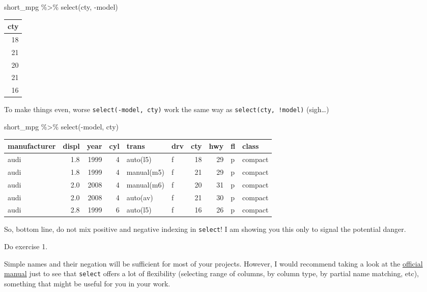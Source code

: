 \documentclass[
]{book}
\newenvironment{Shaded}{\begin{snugshade}}{\end{snugshade}}
\newcommand{\FunctionTok}[1]{\textcolor[rgb]{0.00,0.00,0.00}{#1}}
\newcommand{\NormalTok}[1]{#1}
\newcommand{\SpecialCharTok}[1]{\textcolor[rgb]{0.00,0.00,0.00}{#1}}
\begin{document}
\begin{Shaded}
\begin{Highlighting}[]
\NormalTok{short\_mpg }\SpecialCharTok{\%\textgreater{}\%}
  \FunctionTok{select}\NormalTok{(cty, }\SpecialCharTok{{-}}\NormalTok{model)}
\end{Highlighting}
\end{Shaded}

\begin{tabular}{r}
\hline
cty\\
\hline
18\\
\hline
21\\
\hline
20\\
\hline
21\\
\hline
16\\
\hline
\end{tabular}

To make things even, worse \texttt{select(-model,\ cty)} work the same way as \texttt{select(cty,\ !model)} (sigh\ldots)

\begin{Shaded}
\begin{Highlighting}[]
\NormalTok{short\_mpg }\SpecialCharTok{\%\textgreater{}\%}
  \FunctionTok{select}\NormalTok{(}\SpecialCharTok{{-}}\NormalTok{model, cty)}
\end{Highlighting}
\end{Shaded}

\begin{tabular}{l|r|r|r|l|l|r|r|l|l}
\hline
manufacturer & displ & year & cyl & trans & drv & cty & hwy & fl & class\\
\hline
audi & 1.8 & 1999 & 4 & auto(l5) & f & 18 & 29 & p & compact\\
\hline
audi & 1.8 & 1999 & 4 & manual(m5) & f & 21 & 29 & p & compact\\
\hline
audi & 2.0 & 2008 & 4 & manual(m6) & f & 20 & 31 & p & compact\\
\hline
audi & 2.0 & 2008 & 4 & auto(av) & f & 21 & 30 & p & compact\\
\hline
audi & 2.8 & 1999 & 6 & auto(l5) & f & 16 & 26 & p & compact\\
\hline
\end{tabular}

So, bottom line, do not mix positive and negative indexing in \texttt{select}! I am showing you this only to signal the potential danger.

Do exercise 1.

Simple names and their negation will be sufficient for most of your projects. However, I would recommend taking a look at the \href{https://dplyr.tidyverse.org/reference/select.html}{official manual} just to see that \texttt{select} offers a lot of flexibility (selecting range of columns, by column type, by partial name matching, etc), something that might be useful for you in your work.
\end{document}
